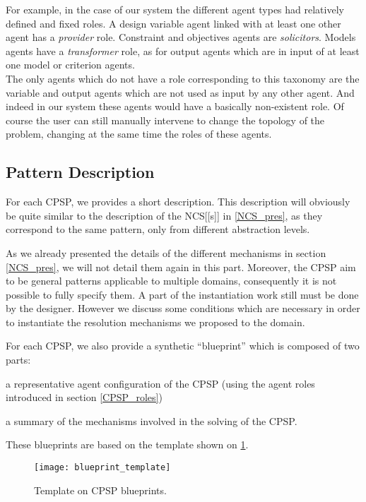 For example, in the case of our system the different agent types had relatively defined and fixed roles. A design variable agent linked with at least one other agent has a \emph{provider} role. Constraint and objectives agents are \emph{solicitors}. Models agents have a \emph{transformer} role, as for output agents which are in input of at least one model or criterion agents.\\
The only agents which do not have a role corresponding to this taxonomy are the variable and output agents which are not used as input by any other agent. And indeed in our system these agents would have a basically non-existent role. Of course the user can still manually intervene to change the topology of the problem, changing at the same time the roles of these agents.

\subsection{Pattern Description}

For each CPSP, we provides a short description. This description will obviously be quite similar to the description of the NCS[[s]] in \ref{NCS_pres}, as they correspond to the same pattern, only from different abstraction levels.

As we already presented the details of the different mechanisms in section \ref{NCS_pres}, we will not detail them again in this part. Moreover, the CPSP aim to be general patterns applicable to multiple domains, consequently it is not possible to fully specify them. A part of the instantiation work still must be done by the designer. However we discuss some conditions which are necessary in order to instantiate the resolution mechanisms we proposed to the domain.

For each CPSP, we also provide a synthetic \enquote{blueprint} which is composed of two parts:
\begin{compactenum}
\item a representative agent configuration of the CPSP (using the agent roles introduced in section \ref{CPSP_roles}) 
\item a summary of the mechanisms involved in the solving of the CPSP.
\end{compactenum}
These blueprints are based on the template shown on \figurename{} \ref{blueprint_template}.

\begin{figure}
\centering
\texttt{[image: blueprint\_template]}
\caption{Template on CPSP blueprints.}\label{blueprint_template}
\end{figure}

